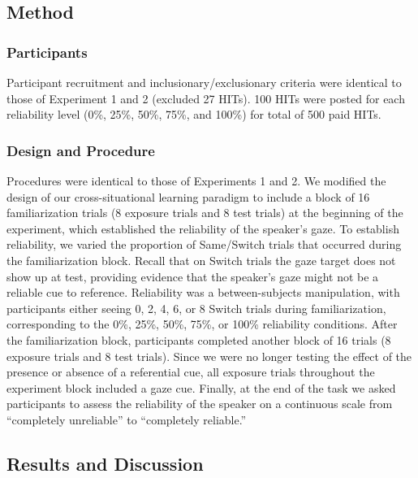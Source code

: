 \documentclass[authoryear, review]{elsarticle}
\begin{document}
\subsection{Method}\label{method-2}

\subsubsection{Participants}\label{participants-2}

Participant recruitment and inclusionary/exclusionary criteria were
identical to those of Experiment 1 and 2 (excluded 27 HITs). 100 HITs
were posted for each reliability level (0\%, 25\%, 50\%, 75\%, and
100\%) for total of 500 paid HITs.

\subsubsection{Design and Procedure}\label{design-and-procedure-2}

Procedures were identical to those of Experiments 1 and 2. We modified
the design of our cross-situational learning paradigm to include a block
of 16 familiarization trials (8 exposure trials and 8 test trials) at
the beginning of the experiment, which established the reliability of
the speaker's gaze. To establish reliability, we varied the proportion
of Same/Switch trials that occurred during the familiarization block.
Recall that on Switch trials the gaze target does not show up at test,
providing evidence that the speaker's gaze might not be a reliable cue
to reference. Reliability was a between-subjects manipulation, with
participants either seeing 0, 2, 4, 6, or 8 Switch trials during
familiarization, corresponding to the 0\%, 25\%, 50\%, 75\%, or 100\%
reliability conditions. After the familiarization block, participants
completed another block of 16 trials (8 exposure trials and 8 test
trials). Since we were no longer testing the effect of the presence or
absence of a referential cue, all exposure trials throughout the
experiment block included a gaze cue. Finally, at the end of the task we
asked participants to assess the reliability of the speaker on a
continuous scale from ``completely unreliable'' to ``completely
reliable.''

\subsection{Results and Discussion}\label{results-and-discussion-2}
\end{document}
